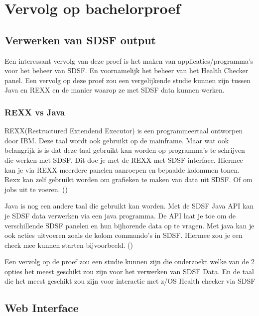 \chapter{Vervolg op bachelorproef}
\label{ch:Vervolg op bachelorproef}

\section{Verwerken van SDSF output}
\label{sec:Verwerken van SDSF output}

Een interessant vervolg van deze proef is het maken van applicaties/programma's voor het beheer van SDSF. En voornamelijk het beheer van het Health Checker panel. Een vervolg op deze proef zou een vergelijkende studie kunnen zijn tussen Java en REXX en de manier waarop ze met SDSF data kunnen werken.

\subsection{REXX vs Java}
\label{subsec:REXX vs Java}



REXX(Restructured Extendend Executor) is een programmeertaal ontworpen door IBM. Deze taal wordt ook gebruikt op de mainframe. Maar wat ook belangrijk is is dat deze taal gebruikt kan worden op programma's te schrijven die werken met SDSF. Dit doe je met de REXX met SDSF interface. Hiermee kan je via REXX meerdere panelen aanroepen en bepaalde kolommen tonen. Rexx kan zelf gebruikt worden om grafieken te maken van data uit SDSF. Of om jobs uit te voeren. (\cite{Parziale2007})

Java is nog een andere taal die gebruikt kan worden. Met de SDSF Java API kan je SDSF data verwerken via een java programma. De API laat je toe om de verschillende SDSF panelen en hun bijhorende data op te vragen. Met java kan je ook acties uitvoeren zoals de kolom commando's in SDSF. Hiermee zou je een check mee kunnen starten bijvoorbeeld. (\cite{Wood2012})

Een vervolg op de proef zou een studie kunnen zijn die onderzoekt welke van de 2 opties het meest geschikt zou zijn voor het verwerken van SDSF Data. En de taal die het meest geschikt zou zijn voor interactie met z/OS Health checker via SDSF



\section{Web Interface}
\label{sec:Web interface}

